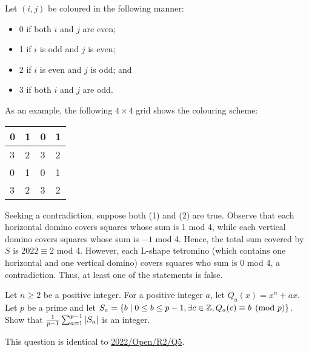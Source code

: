 \begin{solution*}
    Let $(i, j)$ be coloured in the following manner:
    \begin{itemize}
        \item 0 if both $i$ and $j$ are even;
        \item 1 if $i$ is odd and $j$ is even;
        \item 2 if $i$ is even and $j$ is odd; and
        \item 3 if both $i$ and $j$ are odd.
    \end{itemize}

    As an example, the following $4 \times 4$ grid shows the colouring scheme:
    \begin{table}[H]
        \centering
        \begin{tabular}{|l|l|l|l|}
        \hline
        0 & 1 & 0 & 1 \\ \hline
        3 & 2 & 3 & 2 \\ \hline
        0 & 1 & 0 & 1 \\ \hline
        3 & 2 & 3 & 2 \\ \hline
        \end{tabular}
    \end{table}

    Seeking a contradiction, suppose both (1) and (2) are true. Observe that each horizontal domino covers squares whose sum is 1 mod 4, while each vertical domino covers squares whose sum is $-1$ mod 4. Hence, the total sum covered by $S$ is $2022 \equiv 2$ mod 4. However, each L-shape tetromino (which contains one horizontal and one vertical domino) covers squares who sum is 0 mod 4, a contradiction. Thus, at least one of the statements is false.
\end{solution*}

\begin{question}\label{A::2023-O-2-3}
    Let $n \geq 2$ be a positive integer. For a positive integer $a$, let $Q_a(x) = x^n + ax$. Let $p$ be a prime and let $S_a = \left\lbrace b \mid 0 \leq b \leq p - 1, \exists c \in \mathbb{Z}, Q_a(c) \equiv b \pmod{p} \right\rbrace$. Show that $\frac{1}{p-1} \sum_{a=1}^{p-1} \left\lvert S_a \right\rvert$ is an integer.
\end{question}

\begin{remark}
    This question is identical to \hyperref[A::2022-O-2-5]{2022/Open/R2/Q5}.
\end{remark}

